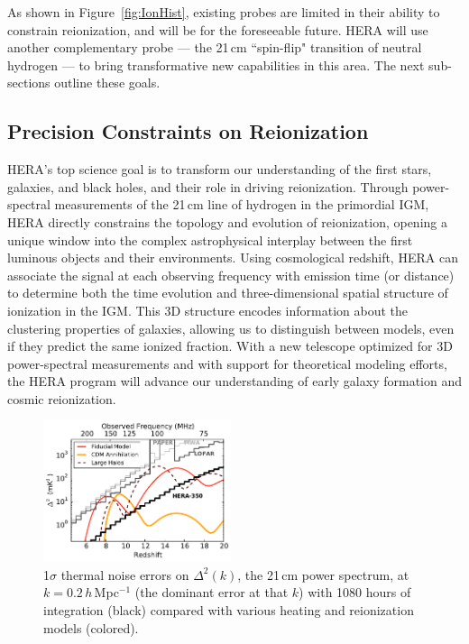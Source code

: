 \documentclass[preprint,11pt]{aastex}
\begin{document}
As shown in Figure~\ref{fig:IonHist},
existing probes are limited in
their ability to constrain reionization, and will be for the foreseeable future.
HERA will use
another complementary probe --- the 21\,cm ``spin-flip" transition of neutral hydrogen
--- to bring transformative new capabilities in this area.  The next sub-sections outline these goals.


\subsection{Precision Constraints on Reionization}
\label{sec:EoRPowerSpectra}


\noindent HERA's top science goal is to transform our understanding of the first stars, galaxies, 
and black holes, and their role in driving reionization. 
Through power-spectral measurements of the 21\,cm line of hydrogen in the primordial IGM,
HERA directly constrains the topology and evolution of reionization, 
opening a unique window into the complex astrophysical interplay between the 
first luminous objects and their environments.
Using cosmological redshift, HERA can associate 
the signal at each observing frequency with emission time (or distance) to determine both the time evolution
and three-dimensional spatial structure of ionization in the IGM.
This 3D structure encodes information about the clustering properties of galaxies,
allowing us to distinguish between models, even if they predict the same ionized fraction. 
With a new telescope optimized for 3D power-spectral measurements and with support for theoretical
modeling efforts, the HERA program will advance our understanding of early galaxy formation and cosmic reionization.


\begin{figure}[h!]
\centering
    \includegraphics[width=0.49\textwidth,clip]{plots/sensitivity_wideband.pdf}
  \caption{ 1$\sigma$ thermal noise errors on $\Delta^2(k)$, the 21\,cm power spectrum, at $k\!=\!0.2$\,$h$\,Mpc$^{-1}$ (the dominant error at that $k$)
with 1080 hours of integration (black)
compared with various heating and reionization models (colored).}
	\label{fig:Sensitivities}
\end{figure}
\end{document}
